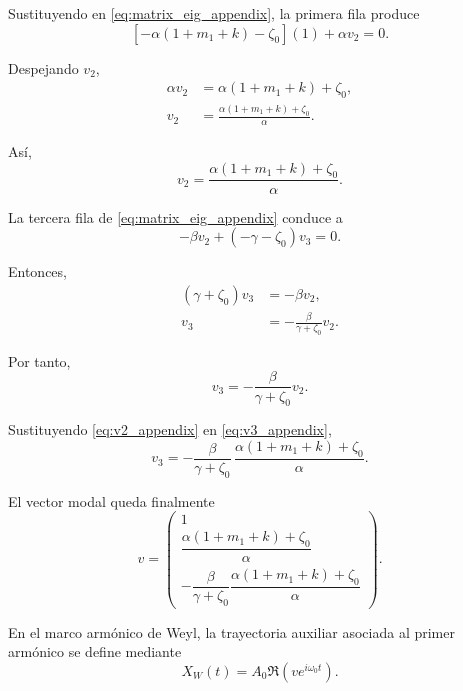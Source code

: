 \documentclass[journal]{IEEEtran}
\begin{document}
Sustituyendo en \eqref{eq:matrix_eig_appendix}, la primera fila produce
\begin{equation}
\label{eq:first_row_appendix}
\left[
-\alpha(1+m_1+k)-\zeta_0
\right](1)
+
\alpha v_2
=
0.
\end{equation}

Despejando \(v_2\),
\begin{align}
\alpha v_2
&=
\alpha(1+m_1+k)+\zeta_0,
\\
v_2
&=
\frac{\alpha(1+m_1+k)+\zeta_0}{\alpha}.
\end{align}

Así,
\begin{equation}
\label{eq:v2_appendix}
v_2
=
\frac{\alpha(1+m_1+k)+\zeta_0}{\alpha}.
\end{equation}

La tercera fila de \eqref{eq:matrix_eig_appendix} conduce a
\begin{equation}
\label{eq:third_row_appendix}
-\beta v_2
+
(-\gamma-\zeta_0)v_3
=
0.
\end{equation}

Entonces,
\begin{align}
(\gamma+\zeta_0)v_3
&=
-\beta v_2,
\\
v_3
&=
-\frac{\beta}{\gamma+\zeta_0}v_2.
\end{align}

Por tanto,
\begin{equation}
\label{eq:v3_appendix}
v_3
=
-\frac{\beta}{\gamma+\zeta_0}v_2.
\end{equation}

Sustituyendo \eqref{eq:v2_appendix} en \eqref{eq:v3_appendix},
\begin{equation}
\label{eq:v3_expanded_appendix}
v_3
=
-
\frac{\beta}{\gamma+\zeta_0}
\,
\frac{\alpha(1+m_1+k)+\zeta_0}{\alpha}.
\end{equation}

El vector modal queda finalmente
\begin{equation}
\label{eq:v_final_appendix}
v=
\begin{pmatrix}
1\\[1ex]
\dfrac{\alpha(1+m_1+k)+\zeta_0}{\alpha}\\[3ex]
-\dfrac{\beta}{\gamma+\zeta_0}
\dfrac{\alpha(1+m_1+k)+\zeta_0}{\alpha}
\end{pmatrix}.
\end{equation}

En el marco armónico de Weyl, la trayectoria auxiliar asociada al primer armónico se define mediante
\begin{equation}
\label{eq:weyl_seed_appendix}
X_W(t)
=
A_0
\Re
\left(
v e^{i\omega_0 t}
\right).
\end{equation}
\end{document}

